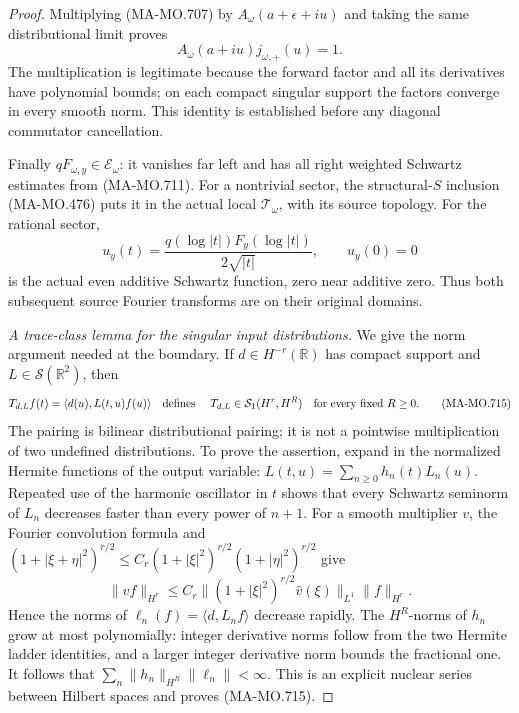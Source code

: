 \begin{proof}
Multiplying (MA-MO.707) by \(A_\omega(a+\epsilon+iu)\)
and taking the same distributional limit proves
\[
                    A_\omega(a+iu)j_{\omega,+}(u)=1 .
 \tag{MA-MO.713}
\]
The multiplication is legitimate because the forward
factor and all its derivatives have polynomial bounds;
on each compact singular support the factors converge
in every smooth norm. This identity is established
before any diagonal commutator cancellation.

Finally \(qF_{\omega,y}\in\mathcal E_\omega\):
it vanishes far left and has all right weighted
Schwartz estimates from (MA-MO.711).
For a nontrivial sector, the structural-\(S\)
inclusion (MA-MO.476) puts it in the actual local
\(\mathcal T_\omega\), with its source topology.
For the rational sector,
\[
       u_y(t)=\frac{q(\log|t|)F_y(\log|t|)}
                         {2\sqrt{|t|}},\qquad u_y(0)=0
 \tag{MA-MO.714}
\]
is the actual even additive Schwartz function,
zero near additive zero. Thus both subsequent
source Fourier transforms are on their original domains.

\emph{A trace-class lemma for the singular input distributions.}
We give the norm argument needed at the boundary.
If \(d\in H^{-r}(\mathbb R)\) has compact support
and \(L\in\mathscr S(\mathbb R^2)\), then
\[
       T_{d,L}f(t)=\langle d(u),L(t,u)f(u)\rangle
          \quad\hbox{defines }\quad
       T_{d,L}\in\mathcal S_1(H^r,H^R)
                    \quad\hbox{for every fixed }R\ge0 .
 \tag{MA-MO.715}
\]
The pairing is bilinear distributional pairing;
it is not a pointwise multiplication of two
undefined distributions. To prove the assertion,
expand in the normalized Hermite functions of
the output variable:
\(L(t,u)=\sum_{n\ge0}h_n(t)L_n(u)\).
Repeated use of the harmonic oscillator in \(t\)
shows that every Schwartz seminorm of \(L_n\)
decreases faster than every power of \(n+1\).
For a smooth multiplier \(v\), the Fourier
convolution formula and
\((1+|\xi+\eta|^2)^{r/2}
 \le C_r(1+|\xi|^2)^{r/2}(1+|\eta|^2)^{r/2}\)
give
\[
 \|vf\|_{H^r}
   \le C_r\bigl\|(1+|\xi|^2)^{r/2}\widehat v(\xi)
                      \bigr\|_{L^1}\|f\|_{H^r}.
 \tag{MA-MO.716}
\]
Hence the norms of
\(\ell_n(f)=\langle d,L_nf\rangle\) decrease rapidly.
The \(H^R\)-norms of \(h_n\) grow at most polynomially:
integer derivative norms follow from the two Hermite
ladder identities, and a larger integer derivative
norm bounds the fractional one. It follows that
\(\sum_n\|h_n\|_{H^R}\|\ell_n\|<\infty\).
This is an explicit nuclear series between Hilbert
spaces and proves (MA-MO.715).


\end{proof}
